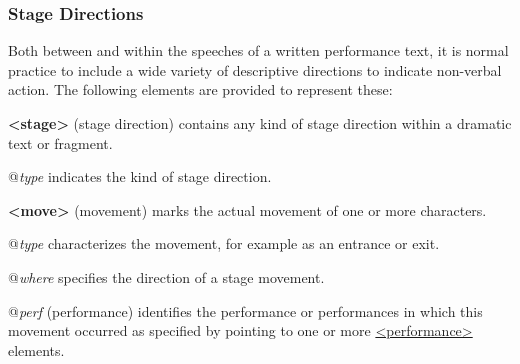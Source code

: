 \subsubsection[{Stage Directions}]{Stage Directions}\label{DRSTA}\par
Both between and within the speeches of a written performance text, it is normal practice to include a wide variety of descriptive directions to indicate non-verbal action. The following elements are provided to represent these: 
\begin{sansreflist}
  
\item [\textbf{<stage>}] (stage direction) contains any kind of stage direction within a dramatic text or fragment.\hfil\\[-10pt]\begin{sansreflist}
    \item[@{\itshape type}]
  indicates the kind of stage direction.
\end{sansreflist}  
\item [\textbf{<move>}] (movement) marks the actual movement of one or more characters.\hfil\\[-10pt]\begin{sansreflist}
    \item[@{\itshape type}]
  characterizes the movement, for example as an entrance or exit.
    \item[@{\itshape where}]
  specifies the direction of a stage movement.
    \item[@{\itshape perf}]
  (performance) identifies the performance or performances in which this movement occurred as specified by pointing to one or more \hyperref[TEI.performance]{<performance>} elements.
\end{sansreflist}  
\end{sansreflist}
\par
